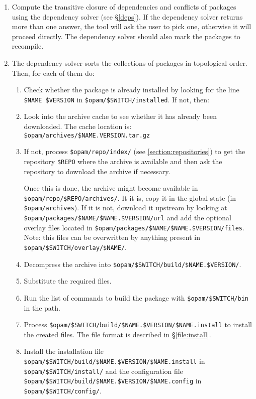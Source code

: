 \documentclass[a4paper,10pt]{article}
\begin{document}
\begin{enumerate}

\item Compute the transitive closure of dependencies and conflicts of
  packages using the dependency solver (see \S\ref{deps}). If the
  dependency solver returns more than one answer, the tool will ask
  the user to pick one, otherwise it will proceed directly. The
  dependency solver should also mark the packages to recompile.

\item The dependency solver sorts the collections of packages in
  topological order. Then, for each of them do:

\begin{enumerate}

\item Check whether the package is already installed by looking for
  the line \verb+$NAME $VERSION+ in \verb+$opam/$SWITCH/installed+.
  If not, then:

\item Look into the archive cache to see whether it has already been
  downloaded. The cache location is:
  \verb+$opam/archives/$NAME.VERSION.tar.gz+

\item If not, process \verb+$opam/repo/index/+ (see
  \ref{section:repositories}) to get the repository
  \verb+$REPO+ where the archive is available and then ask the
  repository to download the archive if necessary.

  Once this is done, the archive might become available in
  \verb+$opam/repo/$REPO/archives/+. It it is, copy it in the global
  state (in \verb+$opam/archives+). If it is not, download it upstream
  by looking at \verb|$opam/packages/$NAME/$NAME.$VERSION/url| and add
  the optional overlay files located in
  \verb|$opam/packages/$NAME/$NAME.$VERSION/files|. Note: this files
  can be overwritten by anything present in
  \verb|$opam/$SWITCH/overlay/$NAME/|.

\item Decompress the archive into \verb+$opam/$SWITCH/build/$NAME.$VERSION/+.

\item Substitute the required files.

\item Run the list of commands to build the package with \verb+$opam/$SWITCH/bin+
  in the path.

\item Process \verb+$opam/$SWITCH/build/$NAME.$VERSION/$NAME.install+ to install
  the created files. The file format is described in \S\ref{file:install}.

\item Install the installation file
  \verb+$opam/$SWITCH/build/$NAME.$VERSION/$NAME.install+ in
  \verb+$opam/$SWITCH/install/+ and the configuration file
  \verb+$opam/$SWITCH/build/$NAME.$VERSION/$NAME.config+ in
  \verb+$opam/$SWITCH/config/+.

\end{enumerate}
\end{enumerate}
\end{document}
